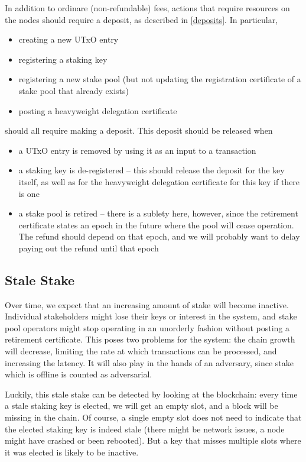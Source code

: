 \documentclass[11pt,a4paper]{article}
\begin{document}
In addition to ordinare (non-refundable) fees, actions that require
resources on the nodes should require a deposit, as described in
\cref{deposits}. In particular,
\begin{itemize}
\item creating a new UTxO entry
\item registering a staking key
\item registering a new stake pool (but not updating the registration
  certificate of a stake pool that already exists)
\item posting a heavyweight delegation certificate
\end{itemize}
should all require making a deposit. This deposit should be released
when
\begin{itemize}
\item a UTxO entry is removed by using it as an input to a transaction
\item a staking key is de-registered -- this should release the
  deposit for the key itself, as well as for the heavyweight
  delegation certificate for this key if there is one
\item a stake pool is retired -- there is a sublety here, however,
  since the retirement certificate states an epoch in the future where
  the pool will cease operation. The refund should depend on that
  epoch, and we will probably want to delay paying out the refund
  until that epoch
\end{itemize}

\subsection{Stale Stake}
\label{stale-stake}

Over time, we expect that an increasing amount of stake will become
inactive. Individual stakeholders might lose their keys or interest in
the system, and stake pool operators might stop operating in an
unorderly fashion without posting a retirement certificate. This poses
two problems for the system: the chain growth will decrease, limiting
the rate at which transactions can be processed, and increasing the
latency. It will also play in the hands of an adversary, since stake
which is offline is counted as adversarial.

Luckily, this stale stake can be detected by looking at the blockchain:
every time a stale staking key is elected, we will get an empty slot,
and a block will be missing in the chain. Of course, a single empty slot
does not need to indicate that the elected staking key is indeed stale
(there might be network issues, a node might have crashed or been
rebooted). But a key that misses multiple slots where it was elected is
likely to be inactive.
\end{document}
